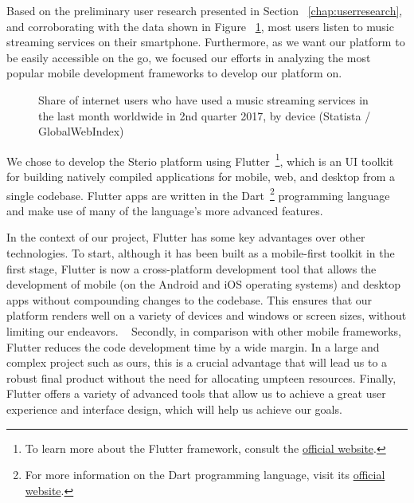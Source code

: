 Based on the preliminary user research presented in Section ~\ref{chap:userresearch}, and corroborating with the data shown in Figure ~\ref{chart:devices}, most users listen to music streaming services on their smartphone. Furthermore, as we want our platform to be easily accessible on the go, we focused our efforts in analyzing the most popular mobile development frameworks to develop our platform on.

\begin{figure}
	\centering
	\caption{Share of internet users who have used a music streaming services in the last month worldwide in 2nd quarter 2017, by device (Statista / GlobalWebIndex)}
	\label{chart:devices}
	\begin{bchart}[step=10,max=45,unit=\%,width=0.8\textwidth]
            \smallskip
            \smallskip
    \end{bchart}
\end{figure}


We chose to develop the Sterio platform using Flutter~\footnote{To learn more about the Flutter framework, consult the \href{https://flutter.dev/}{official website}.}, which is an \ac{UI} toolkit for building natively compiled applications for mobile, web, and desktop from a single codebase. Flutter apps are written in the Dart~\footnote{For more information on the Dart programming language, visit its \href{https://dart.dev/}{official website}.} programming language and make use of many of the language's more advanced features. ~\cite{Payne2019}

In the context of our project, Flutter has some key advantages over other technologies. To start, although it has been built as a mobile-first toolkit in the first stage, Flutter is now a cross-platform development tool that allows the development of mobile (on the Android and iOS operating systems) and desktop apps without compounding changes to the codebase. This ensures that our platform renders well on a variety of devices and windows or screen sizes, without limiting our endeavors. ~\cite{H.GillbertMiller2011} Secondly, in comparison with other mobile frameworks, Flutter reduces the code development time by a wide margin. In a large and complex project such as ours, this is a crucial advantage that will lead us to a robust final product without the need for allocating umpteen resources. Finally, Flutter offers a variety of advanced tools that allow us to achieve a great user experience and interface design, which will help us achieve our goals. ~\cite{Payne2019}

